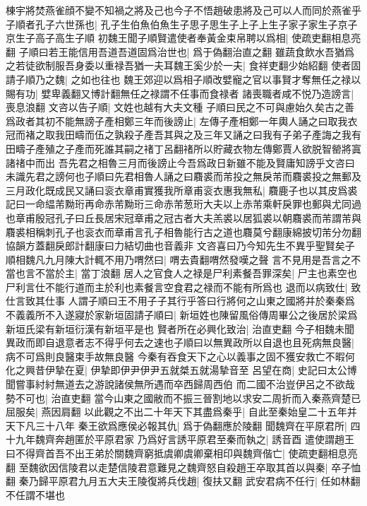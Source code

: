 棟宇將焚燕雀顔不變不知禍之將及己也今子不悟趙破患將及己可以人而同於燕雀乎子順者孔子六世孫也|{
	孔子生伯魚伯魚生子思子思生子上子上生子家子家生子京子京生子高子高生子順}
初魏王聞子順賢遣使者奉黃金束帛聘以爲相|{
	使疏吏翻相息亮翻}
子順曰若王能信用吾道吾道固爲治世也|{
	爲于偽翻治直之翻}
雖蔬食飲水吾猶爲之若徒欲制服吾身委以重禄吾猶一夫耳魏王奚少於一夫|{
	食祥吏翻少始紹翻}
使者固請子順乃之魏|{
	之如也往也}
魏王郊迎以爲相子順改嬖寵之官以事賢才奪無任之禄以賜有功|{
	嬖卑義翻又博計翻無任之禄謂不任事而食禄者}
諸喪職者咸不悦乃造謗言|{
	喪息浪翻}
文咨以告子順|{
	文姓也越有大夫文種}
子順曰民之不可與慮始久矣古之善爲政者其初不能無謗子產相鄭三年而後謗止|{
	左傳子產相鄭一年輿人誦之曰取我衣冠而褚之取我田疇而伍之孰殺子產吾其與之及三年又誦之曰我有子弟子產誨之我有田疇子產殖之子產而死誰其嗣之禇丁呂翻禇所以貯藏衣物左傳鄭賈人欲脱智罃將寘諸禇中而出}
吾先君之相魯三月而後謗止今吾爲政日新雖不能及賢庸知謗乎文咨曰未識先君之謗何也子順曰先君相魯人誦之曰麛裘而芾投之無戾芾而麛裘投之無郵及三月政化既成民又誦曰衮衣章甫實獲我所章甫衮衣惠我無私|{
	麛鹿子也以其皮爲裘記曰一命緼芾黝珩再命赤芾黝珩三命赤芾葱珩大夫以上赤芾乘軒戾罪也郵與尤同過也章甫殷冠孔子曰丘長居宋冠章甫之冠古者大夫羔裘以居狐裘以朝麛裘而芾謂芾與麛裘相稱刺孔子也衮衣而章甫言孔子相魯能行古之道也麛莫兮翻康綿披切芾分勿翻協韻方蓋翻戾郎計翻康曰力結切曲也音義非}
文咨喜曰乃今知先生不異乎聖賢矣子順相魏凡九月陳大計輒不用乃喟然曰|{
	喟去貴翻喟然發嘆之聲}
言不見用是吾言之不當也言不當於主|{
	當丁浪翻}
居人之官食人之禄是尸利素餐吾罪深矣|{
	尸主也素空也尸利言仕不能行道而主於利也素餐言空食君之禄而不能有所爲也}
退而以病致仕|{
	致仕言致其仕事}
人謂子順曰王不用子子其行乎答曰行將何之山東之國將并於秦秦爲不義義所不入遂寢於家新垣固請子順曰|{
	新垣姓也陳留風俗傳周畢公之後居於梁爲新垣氏梁有新垣衍漢有新垣平是也}
賢者所在必興化致治|{
	治直吏翻}
今子相魏未聞異政而即自退意者志不得乎何去之速也子順曰以無異政所以自退也且死病無良醫|{
	病不可爲則良醫束手故無良醫}
今秦有吞食天下之心以義事之固不獲安救亡不暇何化之興昔伊摯在夏|{
	伊摯即伊尹伊尹五就桀五就湯摯音至}
呂望在商|{
	史記曰太公博聞嘗事紂紂無道去之游說諸侯無所遇而卒西歸周西伯}
而二國不治豈伊呂之不欲哉勢不可也|{
	治直吏翻}
當今山東之國敝而不振三晉割地以求安二周折而入秦燕齊楚已屈服矣|{
	燕因肩翻}
以此觀之不出二十年天下其盡爲秦乎|{
	自此至秦始皇二十五年并天下凡三十八年}
秦王欲爲應侯必報其仇|{
	爲于偽翻應於陵翻}
聞魏齊在平原君所|{
	四十九年魏齊奔趙匿於平原君家}
乃爲好言誘平原君至秦而執之|{
	誘音酉}
遣使謂趙王曰不得齊首吾不出王弟於關魏齊窮抵虞卿虞卿棄相印與魏齊偕亡|{
	使疏吏翻相息亮翻}
至魏欲因信陵君以走楚信陵君意難見之魏齊怒自殺趙王卒取其首以與秦|{
	卒子恤翻}
秦乃歸平原君九月五大夫王陵復將兵伐趙|{
	復扶又翻}
武安君病不任行|{
	任如林翻不任謂不堪也}


